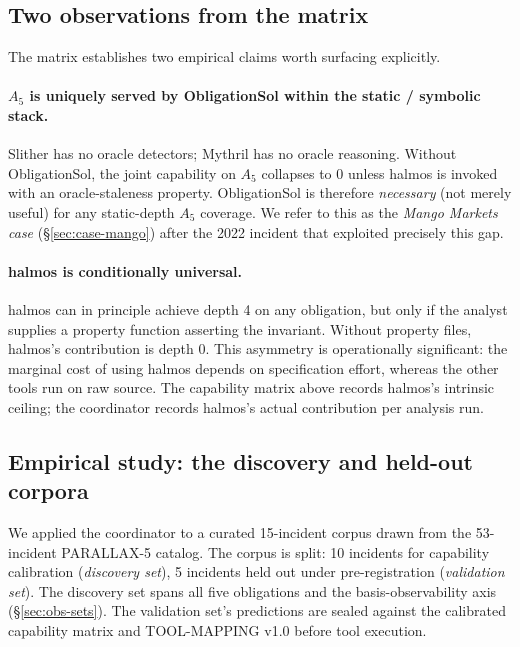 \documentclass[11pt,a4paper]{article}
\begin{document}
\subsection{Two observations from the matrix}

The matrix establishes two empirical claims worth surfacing explicitly.

\paragraph{$A_5$ is uniquely served by ObligationSol within the static / symbolic stack.} Slither has no oracle detectors; Mythril has no oracle reasoning. Without ObligationSol, the joint capability on $A_5$ collapses to 0 unless halmos is invoked with an oracle-staleness property. ObligationSol is therefore \emph{necessary} (not merely useful) for any static-depth $A_5$ coverage. We refer to this as the \emph{Mango Markets case} (\S\ref{sec:case-mango}) after the 2022 incident that exploited precisely this gap.

\paragraph{halmos is conditionally universal.} halmos can in principle achieve depth 4 on any obligation, but only if the analyst supplies a property function asserting the invariant. Without property files, halmos's contribution is depth 0. This asymmetry is operationally significant: the marginal cost of using halmos depends on specification effort, whereas the other tools run on raw source. The capability matrix above records halmos's intrinsic ceiling; the coordinator records halmos's actual contribution per analysis run.

\subsection{Empirical study: the discovery and held-out corpora}\label{sec:empirical-corpus}

We applied the coordinator to a curated 15-incident corpus drawn from the 53-incident PARALLAX-5 catalog. The corpus is split: 10 incidents for capability calibration (\emph{discovery set}), 5 incidents held out under pre-registration (\emph{validation set}). The discovery set spans all five obligations and the basis-observability axis (\S\ref{sec:obs-sets}). The validation set's predictions are sealed against the calibrated capability matrix and TOOL-MAPPING v1.0 before tool execution.
\end{document}
